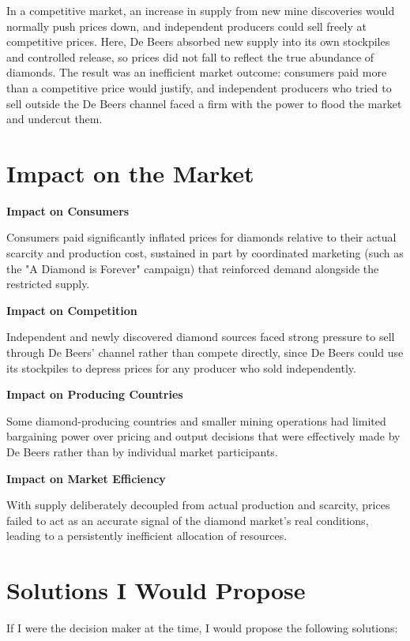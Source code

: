 In a competitive market, an increase in supply from new mine discoveries would normally push prices down, and independent producers could sell freely at competitive prices. Here, De Beers absorbed new supply into its own stockpiles and controlled release, so prices did not fall to reflect the true abundance of diamonds. The result was an inefficient market outcome: consumers paid more than a competitive price would justify, and independent producers who tried to sell outside the De Beers channel faced a firm with the power to flood the market and undercut them.

\section{Impact on the Market}

\textbf{Impact on Consumers}

Consumers paid significantly inflated prices for diamonds relative to their actual scarcity and production cost, sustained in part by coordinated marketing (such as the "A Diamond is Forever" campaign) that reinforced demand alongside the restricted supply.

\textbf{Impact on Competition}

Independent and newly discovered diamond sources faced strong pressure to sell through De Beers' channel rather than compete directly, since De Beers could use its stockpiles to depress prices for any producer who sold independently.

\textbf{Impact on Producing Countries}

Some diamond-producing countries and smaller mining operations had limited bargaining power over pricing and output decisions that were effectively made by De Beers rather than by individual market participants.

\textbf{Impact on Market Efficiency}

With supply deliberately decoupled from actual production and scarcity, prices failed to act as an accurate signal of the diamond market's real conditions, leading to a persistently inefficient allocation of resources.

\section{Solutions I Would Propose}
If I were the decision maker at the time, I would propose the following solutions:

